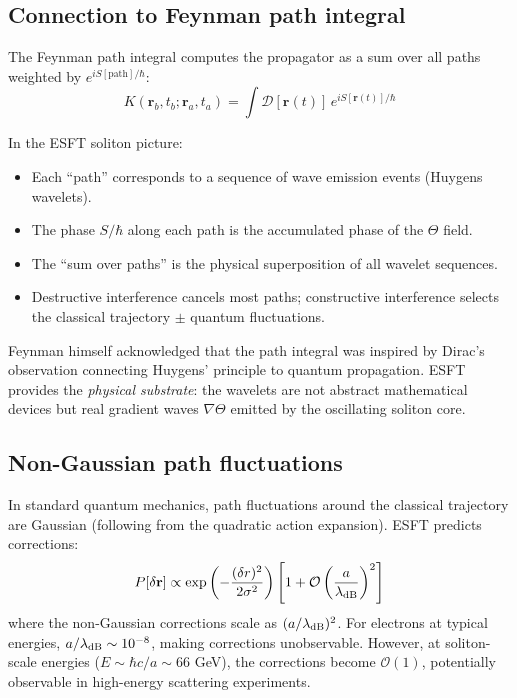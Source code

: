 ﻿\documentclass[twocolumn,showpacs,preprintnumbers,amsmath,amssymb,prd]{revtex4-2}
\begin{document}
\subsection{Connection to Feynman path integral}

The Feynman path integral computes the propagator as a sum over all paths weighted by $e^{iS[\text{path}]/\hbar}$:
\begin{equation}
K(\mathbf{r}_b, t_b; \mathbf{r}_a, t_a) = \int \mathcal{D}[\mathbf{r}(t)]\, e^{iS[\mathbf{r}(t)]/\hbar}
\end{equation}

In the ESFT soliton picture:
\begin{itemize}
\item Each ``path'' corresponds to a sequence of wave emission events (Huygens wavelets).
\item The phase $S/\hbar$ along each path is the accumulated phase of the $\Theta$ field.
\item The ``sum over paths'' is the physical superposition of all wavelet sequences.
\item Destructive interference cancels most paths; constructive interference selects the classical trajectory $\pm$ quantum fluctuations.
\end{itemize}

Feynman himself acknowledged that the path integral was inspired by Dirac's observation connecting Huygens' principle to quantum propagation. ESFT provides the \emph{physical substrate}: the wavelets are not abstract mathematical devices but real gradient waves $\nabla\Theta$ emitted by the oscillating soliton core.

\subsection{Non-Gaussian path fluctuations}

In standard quantum mechanics, path fluctuations around the classical trajectory are Gaussian (following from the quadratic action expansion). ESFT predicts corrections:
\begin{equation}
P[\delta\mathbf{r}] \propto \exp\left(-\frac{(\delta r)^2}{2\sigma^2}\right)\left[1 + \mathcal{O}\left(\frac{a}{\lambda_{\rm dB}}\right)^2\right]
\end{equation}
where the non-Gaussian corrections scale as $(a/\lambda_{\rm dB})^2$. For electrons at typical energies, $a/\lambda_{\rm dB} \sim 10^{-8}$, making corrections unobservable. However, at soliton-scale energies ($E \sim \hbar c/a \sim 66$ GeV), the corrections become $\mathcal{O}(1)$, potentially observable in high-energy scattering experiments.
\end{document}
